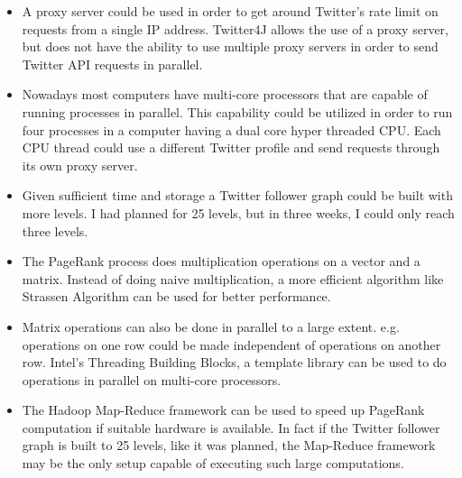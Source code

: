 \documentclass{sig-alternate-05-2015}
\begin{document}
\begin{itemize}

\item A proxy server could be used in order to get around Twitter's rate limit on requests from a single IP address. Twitter4J allows the use of a proxy server, but does not have the ability to use multiple proxy servers in order to send Twitter API requests in parallel. \item Nowadays most computers have multi-core processors that are capable of running processes in parallel. This capability could be utilized in order to run four processes in a computer having a dual core hyper threaded CPU. Each CPU thread could use a different Twitter profile and send requests through its own proxy server.

\item Given sufficient time and storage a Twitter follower graph could be built with more levels. I had planned for 25 levels, but in three weeks, I could only reach three levels. 

\item The PageRank process does multiplication operations on a vector and a matrix. Instead of doing naive multiplication, a more efficient algorithm like Strassen Algorithm\cite{MatrixMult} can be used for better performance.

\item Matrix operations can also be done in parallel to a large extent. e.g. operations on one row could be made independent of operations on another row. Intel's Threading Building Blocks\cite{TBB}, a template library can be used to do operations in parallel on multi-core processors.

\item The Hadoop Map-Reduce framework can be used to speed up PageRank computation if suitable hardware is available. In fact if the Twitter follower graph is built to 25 levels, like it was planned, the Map-Reduce framework may be the only setup capable of executing such large computations.

\end{itemize}
\end{document}
